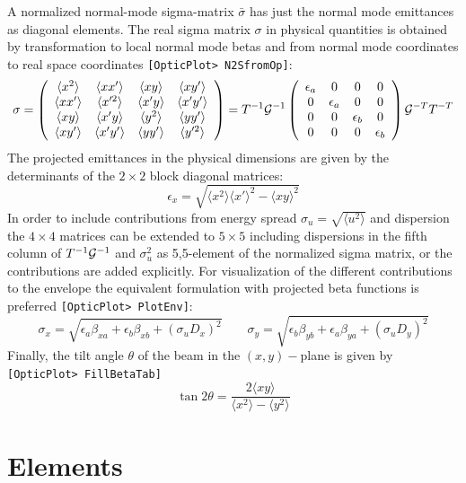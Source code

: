 \documentclass[12pt]{article}
\newcommand\beq{\begin{equation}}
\newcommand\eeq{\end{equation}}
\newcommand\code[1]{{\tt [#1]}}
\begin{document}
A normalized normal-mode sigma-matrix $\bar{\sigma}$ has just the normal mode emittances as diagonal elements. The real sigma matrix $\sigma$ in physical quantities is obtained by transformation to local normal mode betas and from normal mode coordinates to real space coordinates \code{OpticPlot> N2SfromOp}:
\beq
\sigma = \left(\begin{array}{cccc}
\langle x^2 \rangle & \langle xx' \rangle & \langle xy \rangle & \langle xy' \rangle \\
\langle xx' \rangle & \langle x'^2 \rangle & \langle x'y \rangle & \langle x'y' \rangle \\
\langle xy \rangle & \langle x'y \rangle & \langle y^2 \rangle & \langle yy' \rangle \\
\langle xy' \rangle & \langle x'y' \rangle & \langle yy' \rangle & \langle y'^2 \rangle
\end{array}\right)
=
T^{-1} {\cal G}^{-1}
\left(\begin{array}{cccc}
\epsilon_a & 0 & 0 & 0 \\
0 & \epsilon_a & 0 & 0 \\
0 & 0 & \epsilon_b & 0 \\
0 & 0 & 0 & \epsilon_b
\end{array}\right) {\cal G}^{-T} T^{-T}
\eeq
The projected emittances in the physical dimensions are given by the determinants of the $2\times 2$ block diagonal matrices:
\beq
\epsilon_x = \sqrt{\langle x^2 \rangle \langle x'\rangle^2- \langle xy \rangle^2}
\eeq
In order to include contributions from energy spread $\sigma_u=\sqrt{\langle u^2 \rangle}$ and dispersion the $4\times 4$ matrices can be extended to $5\times 5$ including dispersions in the fifth column of $T^{-1} {\cal G}^{-1}$ and $\sigma_u^2$ as 5,5-element of the normalized sigma matrix, or the contributions are added explicitly. For visualization of the different contributions to the envelope the equivalent formulation with projected beta functions is preferred \code{OpticPlot> PlotEnv}:
\beq
\sigma_x=\sqrt{\epsilon_a \beta_{xa} + \epsilon_b \beta_{xb} + (\sigma_u D_x)^2} \qquad
\sigma_y=\sqrt{\epsilon_b \beta_{yb} + \epsilon_a \beta_{ya} + (\sigma_u D_y)^2}
\eeq
Finally, the tilt angle $\theta$ of the beam in the $(x,y)-$plane is given by \code{OpticPlot> FillBetaTab}
\beq
\tan 2\theta =\frac{ 2 \langle xy \rangle}{\langle x^2 \rangle - \langle y^2 \rangle}
\eeq

\section{Elements}
\end{document}
